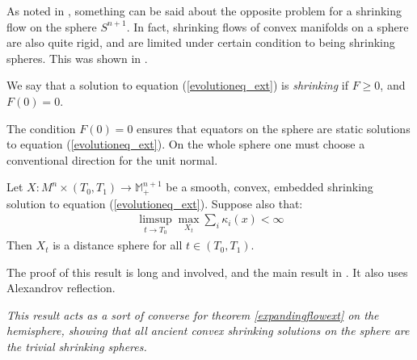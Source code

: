 As noted in \cite{summary}, something can be said about the opposite problem for a shrinking flow on the sphere $S^{n+1}$. In fact, shrinking flows of convex manifolds on a sphere are also quite rigid, and are limited under certain condition to being shrinking spheres. This was shown in \cite{BryanIvakiScheuer}. 

\begin{defin}
	We say that a solution to equation (\ref{evolutioneq_ext}) is {\em shrinking} if $F\geq 0$, and $F(0)=0$. 
\end{defin}
The condition $F(0)=0$ ensures that equators on the sphere are static solutions to equation (\ref{evolutioneq_ext}). On the whole sphere one must choose a conventional direction for the unit normal. 


\begin{theorem}
	Let $ X : M^n \times (T_0, T_1) \to \mathbb{M}^{n+1}_+ $ be a smooth, convex, embedded shrinking solution to equation (\ref{evolutioneq_ext}). Suppose also that:
	\begin{align*}
		\limsup_{t\rightarrow T_0} \max_{X_t} \sum_i \kappa_i(x)<\infty
	\end{align*}
	Then $X_t$ is a distance sphere for all $t\in  (T_0, T_1)$.
\end{theorem}

The proof of this result is long and involved, and the main result in \cite{BryanIvakiScheuer}. It also uses Alexandrov reflection. 
\begin{oss}
	\em
	This result acts as a sort of converse for theorem \ref{expandingflowext} on the hemisphere, showing that all ancient convex shrinking solutions on the sphere are the trivial shrinking spheres. 
\end{oss}
